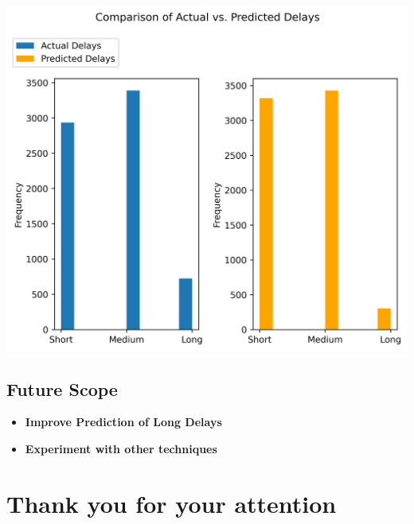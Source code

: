 \documentclass[
  letterpaper,
  DIV=11,
  numbers=noendperiod]{scrartcl}
\providecommand{\tightlist}{%
  \setlength{\itemsep}{0pt}\setlength{\parskip}{0pt}}\usepackage{longtable,booktabs,array}
\begin{document}
\begin{center}
\includegraphics{results/images/PredictedVsActual.png}
\end{center}

\subsection{Future Scope}\label{future-scope}

\begin{itemize}
\tightlist
\item
  \textbf{Improve Prediction of Long Delays}
\item
  \textbf{Experiment with other techniques}
\end{itemize}

\section{Thank you for your
attention}\label{thank-you-for-your-attention}
\end{document}
